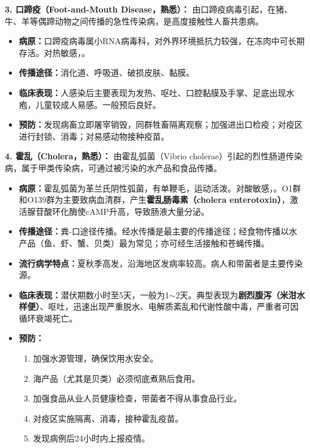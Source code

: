 \begin{defbox}
\textbf{3. 口蹄疫（Foot-and-Mouth Disease，熟悉）：}
由口蹄疫病毒引起，在猪、牛、羊等偶蹄动物之间传播的急性传染病，是高度接触性人畜共患病。
\begin{itemize}[leftmargin=*]
    \item \textbf{病原：}口蹄疫病毒属小RNA病毒科，对外界环境抵抗力较强，在冻肉中可长期存活。对热敏感，。
    \item \textbf{传播途径：}消化道、呼吸道、破损皮肤、黏膜。
    \item \textbf{临床表现：}人感染后主要表现为发热、呕吐、口腔黏膜及手掌、足底出现水疱，儿童较成人易感。一般预后良好。
    \item \textbf{预防：}发现病畜立即屠宰销毁，同群牲畜隔离观察；加强进出口检疫；对疫区进行封锁、消毒；对易感动物接种疫苗。
\end{itemize}

\textbf{4. 霍乱（Cholera，熟悉）：}
由霍乱弧菌（Vibrio cholerae）引起的烈性肠道传染病，属于甲类传染病，可通过被污染的水产品和食品传播。
\begin{itemize}[leftmargin=*]
    \item \textbf{病原：}霍乱弧菌为革兰氏阴性弧菌，有单鞭毛，运动活泼。对酸敏感，。O1群和O139群为主要致病血清群，产生\textbf{霍乱肠毒素（cholera enterotoxin）}，激活腺苷酸环化酶使cAMP升高，导致肠液大量分泌。
    \item \textbf{传播途径：}粪-口途径传播。经水传播是最主要的传播途径；经食物传播以水产品（鱼、虾、蟹、贝类）最为常见；亦可经生活接触和苍蝇传播。
    \item \textbf{流行病学特点：}夏秋季高发，沿海地区发病率较高。病人和带菌者是主要传染源。
    \item \textbf{临床表现：}潜伏期数小时至5天，一般为1$\sim$2天。典型表现为\textbf{剧烈腹泻（米泔水样便）}、呕吐，迅速出现严重脱水、电解质紊乱和代谢性酸中毒，严重者可因循环衰竭死亡。
    \item \textbf{预防：}
    \begin{enumerate}
        \item 加强水源管理，确保饮用水安全。
        \item 海产品（尤其是贝类）必须彻底煮熟后食用。
        \item 加强食品从业人员健康检查，带菌者不得从事食品行业。
        \item 对疫区实施隔离、消毒，接种霍乱疫苗。
        \item 发现病例后24小时内上报疫情。
    \end{enumerate}
\end{itemize}


\end{defbox}
